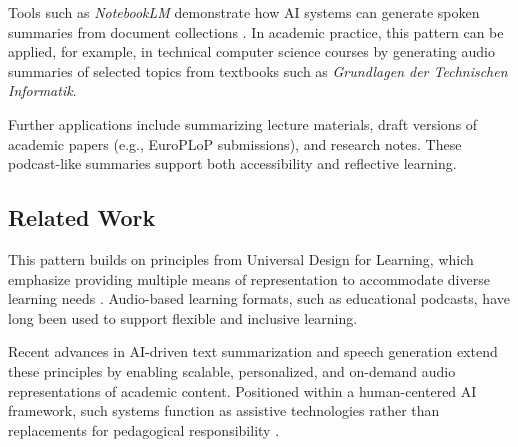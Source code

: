 Tools such as \emph{NotebookLM} demonstrate how AI systems can generate spoken summaries from document collections \cite{notebooklm2024}. In academic practice, this pattern can be applied, for example, in technical computer science courses by generating audio summaries of selected topics from textbooks such as \emph{Grundlagen der Technischen Informatik}.

Further applications include summarizing lecture materials, draft versions of academic papers (e.g., EuroPLoP submissions), and research notes. These podcast-like summaries support both accessibility and reflective learning.

\subsection*{Related Work}

This pattern builds on principles from Universal Design for Learning, which emphasize providing multiple means of representation to accommodate diverse learning needs \cite{al-azawei2016}. Audio-based learning formats, such as educational podcasts, have long been used to support flexible and inclusive learning.

Recent advances in AI-driven text summarization and speech generation extend these principles by enabling scalable, personalized, and on-demand audio representations of academic content. Positioned within a human-centered AI framework, such systems function as assistive technologies rather than replacements for pedagogical responsibility \cite{shneiderman2020}.














